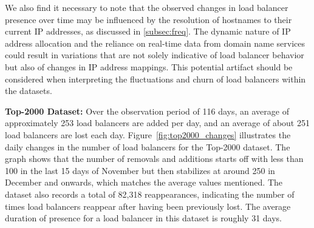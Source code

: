 \documentclass[12pt]{cwru_thesis}
\begin{document}
We also find it necessary to note that the observed changes in load balancer presence over time may be influenced by the resolution of hostnames to their current IP addresses, as discussed in \ref{subsec:freq}. The dynamic nature of IP address allocation and the reliance on real-time data from domain name services could result in variations that are not solely indicative of load balancer behavior but also of changes in IP address mappings. This potential artifact should be considered when interpreting the fluctuations and churn of load balancers within the datasets.



\textbf{Top-2000 Dataset:} Over the observation period of 116 days, an average of approximately 253 load balancers are added per day, and an average of about 251 load balancers are lost each day. Figure~\ref{fig:top2000_changes} illustrates the daily changes in the number of load balancers for the Top-2000 dataset. The graph shows that the number of removals and additions starts off with less than 100 in the last 15 days of November but then stabilizes at around 250 in December and onwards, which matches the average values mentioned. The dataset also records a total of 82,318 reappearances, indicating the number of times load balancers reappear after having been previously lost. The average duration of presence for a load balancer in this dataset is roughly 31 days.
\end{document}

